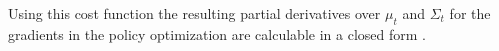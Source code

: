 \documentclass[letterpaper, 10 pt, conference]{ieeeconf}  %
\begin{document}
Using this cost function the resulting partial derivatives over $\mu_t$ and $\Sigma_t$ for the gradients in the policy optimization are calculable in a closed form \cite{GP_deisenroth}.

\end{document}
